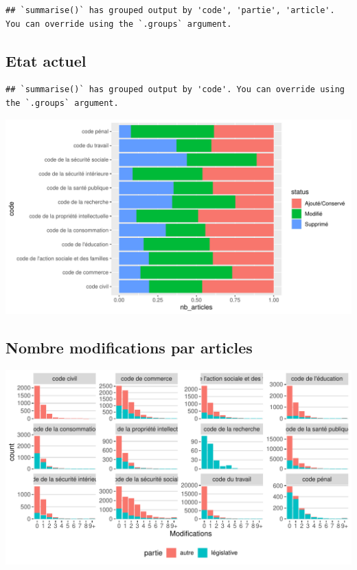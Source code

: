 \documentclass[
  oneside]{book}
\begin{document}
\begin{verbatim}
## `summarise()` has grouped output by 'code', 'partie', 'article'. You can override using the `.groups` argument.
\end{verbatim}

\hypertarget{etat-actuel}{%
\subsection{Etat actuel}\label{etat-actuel}}

\begin{verbatim}
## `summarise()` has grouped output by 'code'. You can override using the `.groups` argument.
\end{verbatim}

\includegraphics{05-images_files/figure-latex/modif.glob.plot1-1.pdf}

\hypertarget{nombre-modifications-par-articles}{%
\subsection{Nombre modifications par articles}\label{nombre-modifications-par-articles}}

\includegraphics{05-images_files/figure-latex/modif.glob.plot2-1.pdf}
\end{document}
